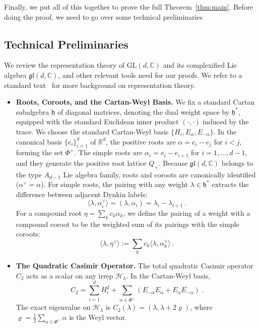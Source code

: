 \documentclass[a4paper,onecolumn,11pt]{quantumarticle}
\def\h{\mathcal{H}}
\begin{document}
Finally, we put all of this together to prove the full Theorem~\ref{thm:main}. Before doing the proof, we need to go over some technical preliminaries\\

\subsection{Technical Preliminaries}\label{sec:prelim}

We review the representation theory of $\mathrm{GL}(d,\mathbb C)$ and its complexified Lie algebra $\mathfrak{gl}(d, \mathbb{C})$, and other relevant tools need for our proofs. We refer to a standard text~\cite{fulton1991representation} for more background on representation theory.

\begin{itemize}
    
\item\textbf{Roots, Coroots, and the Cartan-Weyl Basis.}
We fix a standard Cartan subalgebra $\mathfrak{h}$ of diagonal matrices, denoting the dual weight space by $\mathfrak{h}^*$, equipped with the standard Euclidean inner product $(\cdot, \cdot)$ induced by the trace.
We choose the standard Cartan-Weyl basis $\{H_i, E_\alpha, E_{-\alpha}\}$. In the canonical basis $\{e_i\}_{i=1}^d$ of $\mathbb{R}^d$, the positive roots are $\alpha = e_i - e_j$ for $i < j$, forming the set $\Phi^+$. The simple roots are $\alpha_i = e_i - e_{i+1}$ for $i = 1, \dots, d-1$, and they generate the positive root lattice $Q_+$. Because $\mathfrak{gl}(d, \mathbb{C})$ belongs to the type $A_{d-1}$ Lie algebra family, roots and coroots are canonically identified ($\alpha^\vee = \alpha$). For simple roots, the pairing with any weight $\lambda \in \mathfrak{h}^*$ extracts the difference between adjacent Dynkin labels:
\begin{equation}\label{eq:pairing}
    \langle \lambda, \alpha_i^\vee \rangle = (\lambda, \alpha_i) = \lambda_i - \lambda_{i+1} \ .
\end{equation}
For a compound root \(\eta=\sum_k c_k\alpha_k\), we define the pairing of a weight with a compound coroot to be the weighted sum of its pairings with the simple coroots: \[ \langle \lambda,\eta^\vee\rangle := \sum_k c_k\langle \lambda,\alpha_k^\vee\rangle \ . \]

\item\textbf{The Quadratic Casimir Operator.}
The total quadratic Casimir operator $C_2$ acts as a scalar on any irrep $\h_\lambda$. In the Cartan-Weyl basis, 
\begin{equation}
    C_2 = \sum_{i=1}^d H_i^2 + \sum_{\alpha\in\Phi^+} (E_{-\alpha} E_\alpha + E_\alpha E_{-\alpha}) \ .
\end{equation}
The exact eigenvalue on $\h_\lambda$ is $C_2(\lambda) = (\lambda, \lambda + 2\varrho)$, where $\varrho = \frac{1}{2} \sum_{\alpha \in\Phi^+} \alpha$ is the Weyl vector.



\end{itemize}
\end{document}
